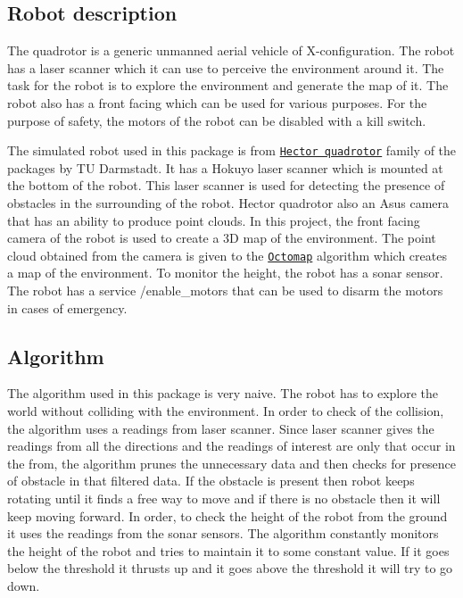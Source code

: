 \subsection*{\label{_description}%
 Robot description}

The quadrotor is a generic unmanned aerial vehicle of X-\/configuration. The robot has a laser scanner which it can use to perceive the environment around it. The task for the robot is to explore the environment and generate the map of it. The robot also has a front facing which can be used for various purposes. For the purpose of safety, the motors of the robot can be disabled with a kill switch.

The simulated robot used in this package is from \href{http://wiki.ros.org/hector_quadrotor}{\tt Hector quadrotor} family of the packages by TU Darmstadt. It has a Hokuyo laser scanner which is mounted at the bottom of the robot. This laser scanner is used for detecting the presence of obstacles in the surrounding of the robot. Hector quadrotor also an Asus camera that has an ability to produce point clouds. In this project, the front facing camera of the robot is used to create a 3D map of the environment. The point cloud obtained from the camera is given to the \href{http://wiki.ros.org/octomap}{\tt Octomap} algorithm which creates a map of the environment. To monitor the height, the robot has a sonar sensor. The robot has a service {\ttfamily /enable\+\_\+motors} that can be used to disarm the motors in cases of emergency.

\subsection*{\label{_algorithm}%
 Algorithm}

The algorithm used in this package is very naive. The robot has to explore the world without colliding with the environment. In order to check of the collision, the algorithm uses a readings from laser scanner. Since laser scanner gives the readings from all the directions and the readings of interest are only that occur in the from, the algorithm prunes the unnecessary data and then checks for presence of obstacle in that filtered data. If the obstacle is present then robot keeps rotating until it finds a free way to move and if there is no obstacle then it will keep moving forward. In order, to check the height of the robot from the ground it uses the readings from the sonar sensors. The algorithm constantly monitors the height of the robot and tries to maintain it to some constant value. If it goes below the threshold it thrusts up and it goes above the threshold it will try to go down.

